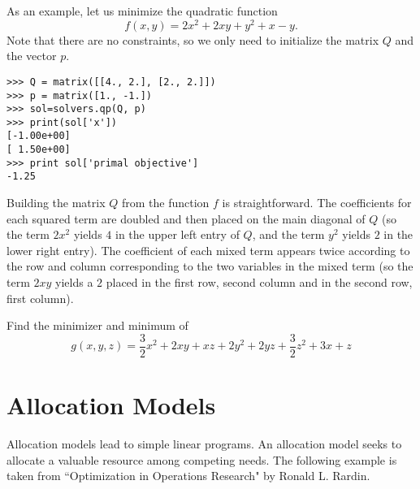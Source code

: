 As an example, let us minimize the quadratic function
\[
f(x,y) = 2x^2 +2xy + y^2 +x -y.
\]
Note that there are no constraints, so we only need to initialize the matrix $Q$ and the vector $p$.
\begin{lstlisting}
>>> Q = matrix([[4., 2.], [2., 2.]])
>>> p = matrix([1., -1.])
>>> sol=solvers.qp(Q, p)
>>> print(sol['x'])
[-1.00e+00]
[ 1.50e+00]
>>> print sol['primal objective']
-1.25
\end{lstlisting}
Building the matrix $Q$ from the function $f$ is straightforward. The coefficients for each squared term are doubled and then placed on the main diagonal of $Q$ (so the term $2x^2$ yields $4$ in the upper left entry of
$Q$, and the term $y^2$ yields $2$ in the lower right entry).
The coefficient of each mixed term appears twice according to the row and column corresponding to the two
variables in the mixed term (so the term $2xy$ yields a $2$ placed in the first row, second column and in
the second row, first column). 

\begin{problem}
Find the minimizer and minimum of
\begin{equation*}
g(x,y,z) = \frac{3}{2}x^2 +2xy + xz+ 2y^2 +2yz+\frac{3}{2}z^2+3x + z
\end{equation*}
\begin{comment}
\begin{equation}
f(x) = \frac{1}{2}x^TQx - x^Tp
\end{equation}
where

\begin{center}
$Q =
\begin{bmatrix}
3 & 2 & 1\\
2 & 4 & 2\\
1 & 2 & 3\\
\end{bmatrix}
$
and $p =
\begin{bmatrix}
3\\
0\\
1\\
\end{bmatrix}
$
\end{center}
\end{comment}

\end{problem}

\section*{Allocation Models}
Allocation models lead to simple linear programs. An allocation model seeks to allocate a valuable resource among competing needs. The following example is taken from ``Optimization in Operations Research" by Ronald L. Rardin. %

